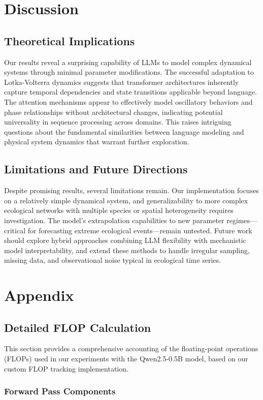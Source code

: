 \documentclass{article}
\begin{document}
\section*{Discussion}
\subsection*{Theoretical Implications}
Our results reveal a surprising capability of LLMs to model complex dynamical systems through minimal parameter modifications. The successful adaptation to Lotka-Volterra dynamics suggests that transformer architectures inherently capture temporal dependencies and state transitions applicable beyond language. The attention mechanisms appear to effectively model oscillatory behaviors and phase relationships without architectural changes, indicating potential universality in sequence processing across domains. This raises intriguing questions about the fundamental similarities between language modeling and physical system dynamics that warrant further exploration.

\subsection*{Limitations and Future Directions}
Despite promising results, several limitations remain. Our implementation focuses on a relatively simple dynamical system, and generalizability to more complex ecological networks with multiple species or spatial heterogeneity requires investigation. The model's extrapolation capabilities to new parameter regimes—critical for forecasting extreme ecological events—remain untested. Future work should explore hybrid approaches combining LLM flexibility with mechanistic model interpretability, and extend these methods to handle irregular sampling, missing data, and observational noise typical in ecological time series.
\section*{Appendix}
\subsection*{Detailed FLOP Calculation}

This section provides a comprehensive accounting of the floating-point operations (FLOPs) used in our experiments with the Qwen2.5-0.5B model, based on our custom FLOP tracking implementation.

\subsubsection*{Forward Pass Components}
\end{document}
